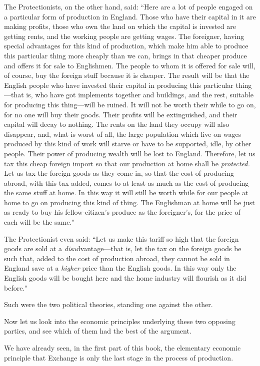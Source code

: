 \documentclass{book}
\begin{document}
The Protectionists, on the other hand, said: “Here are a lot of people engaged on a particular form of production in England. Those who have their capital in it are making profits, those who own the land on which the capital is invested are getting rents, and the working people are getting wages. The foreigner, having special advantages for this kind of production, which make him able to produce this particular thing more cheaply than we can, brings in that cheaper produce and offers it for sale to Englishmen. The people to whom it is offered for sale will, of course, buy the foreign stuff because it is cheaper. The result will be that the English people who have invested their capital in producing this particular thing—that is, who have got implements together and buildings, and the rest, suitable for producing this thing—will be ruined. It will not be worth their while to go on, for no one will buy their goods. Their profits will be extinguished, and their capital will decay to nothing. The rents on the land they occupy will also disappear, and, what is worst of all, the large population which live on wages produced by this kind of work will starve or have to be supported, idle, by other people. Their power of producing wealth will be lost to England. Therefore, let us tax this cheap foreign import so that our production at home shall be \emph{protected.} Let us tax the foreign goods as they come in, so that the cost of producing abroad, with this tax added, comes to at least as much as the cost of producing the same stuff at home. In this way it will still be worth while for our people at home to go on producing this kind of thing. The Englishman at home will be just as ready to buy his fellow-citizen’s produce as the foreigner’s, for the price of each will be the same."

The Protectionist even said: “Let us make this tariff so high that the foreign goods are sold at a \emph{dis}advantage—that is, let the tax on the foreign goods be such that, added to the cost of production abroad, they cannot be sold in England save at a \emph{higher} price than the English goods. In this way only the English goods will be bought here and the home industry will flourish as it did before."

Such were the two political theories, standing one against the other.

Now let us look into the economic principles underlying these two opposing parties, and see which of them had the best of the argument.

We have already seen, in the first part of this book, the elementary economic principle that Exchange is only the last stage in the process of production.
\end{document}
